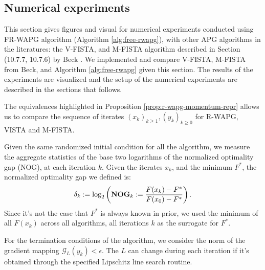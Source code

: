 \documentclass[12pt]{article}
\begin{document}
    \subsection{Numerical experiments}
        This section gives figures and visual for numerical experiments conducted using FR-WAPG algorithm (Algorithm \ref{alg:free-rwapg}), with other APG algorithms in the literatures: the V-FISTA, and M-FISTA algorithm described in Section (10.7.7, 10.7.6) by Beck \cite{beck_first-order_2017}. 
        We implemented and compare V-FISTA, M-FISTA from Beck, and Algorithm \ref{alg:free-rwapg} given this section. 
        The results of the experiments are visualized and the setup of the numerical experiments are described  in the sections that follows. 
        \par
        The equivalences highlighted in Proposition \ref{prop:r-wapg-momentum-repr} allows us to compare the sequence of iterates $(x_k)_{k \ge 1}, (y_k)_{k \ge0}$ for R-WAPG, VISTA and M-FISTA. 
        \par
        Given the same randomized initial condition for all the algorithm, we measure the aggregate statistics of the base two logarithms of the normalized optimality gap (NOG), at each iteration $k$.  
        Given the iterates $x_k$, and the minimum $F^*$, the normalized optimality gap we defined is: 
        \newcommand{\NOG}{\text{\textbf{NOG}}}
        \begin{align*}
            \delta_k := \log_2\left(
                \NOG_k := \frac{F(x_k) - F^*}{F(x_0) - F^*}
            \right). 
        \end{align*}
        Since it's not the case that $F^*$ is always known in prior, we used the minimum of all $F(x_k)$ across all algorithms, all iterations $k$ as the surrogate for $F^*$. 
        \par 
        For the termination conditions of the algorithm, we consider the norm of the gradient mapping $\mathcal G_L(y_k) < \epsilon$. 
        The $L$ can change during each iteration if it's obtained through the specified Lipschitz line search routine. 
\end{document}
